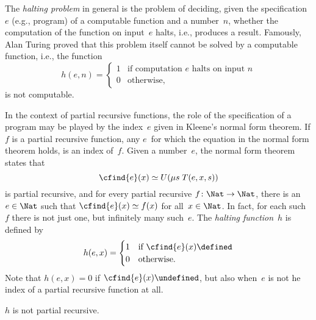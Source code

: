 \documentclass[../../include/open-logic-section]{subfiles}
\begin{document}

The \emph{halting problem} in general is the problem of deciding,
given the specification~$e$ (e.g., program) of a computable function
and a number~$n$, whether the computation of the function on input~$e$
halts, i.e., produces a result.  Famously, Alan Turing proved that
this problem itself cannot be solved by a computable function, i.e.,
the function
\[
h(e, n) = 
\begin{cases}
1 & \text{if computation $e$ halts on input $n$}\\
0 & \text{otherwise,}
\end{cases}
\]
is not computable.

In the context of partial recursive functions, the role of the
specification of a program may be played by the index~$e$ given in
Kleene's normal form theorem.  If $f$ is a partial recursive function,
any $e$~for which the equation in the normal form theorem holds, is an
index of~$f$. Given a number~$e$, the normal form theorem states that
\[
\cfind{e}(x) \simeq U(\mu s \; T(e, x, s))
\]
is partial recursive, and for every partial recursive $f\colon \Nat
\to \Nat$, there is an $e \in \Nat$ such that $\cfind{e}(x) \simeq
f(x)$ for all~$x \in \Nat$.  In fact, for each such $f$ there is not
just one, but infinitely many such~$e$.  The \emph{halting function}~$h$
is defined by
\[
h(e, x) = 
\begin{cases}
1 & \text{if $\cfind{e}(x) \defined$}\\
0 & \text{otherwise.}
\end{cases}
\]
Note that $h(e, x) = 0$ if $\cfind{e}(x) \undefined$, but also
when~$e$ is not he index of a partial recursive function at all.

\begin{thm}
$h$ is not partial recursive.
\end{thm}
\end{document}
